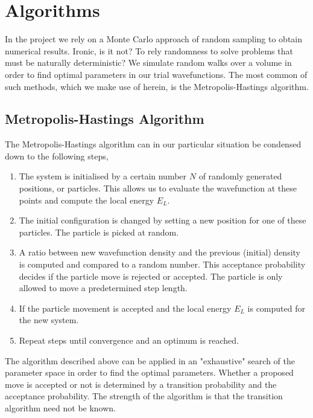\documentclass[
    a4paper, aps, twocolumn, floatfix, superscriptaddress, nofootinbib]{revtex4-1}
\newcommand{\1}{\mathds{1}}
\begin{document}
\section{Algorithms}

In the project we rely on a Monte Carlo approach of random sampling to obtain numerical results.
Ironic, is it not? To rely randomness to solve problems that must be naturally deterministic?
We simulate random walks over a volume in order to find optimal parameters in our trial wavefunctions.
The most common of such methods, which we make use of herein, is the Metropolis-Hastings algorithm.

\subsection{Metropolis-Hastings Algorithm}
The Metropolis-Hastings algorithm can in our particular situation be condensed down to the following steps,
\begin{enumerate}
    \item The system is initialised by a certain number $N$ of randomly generated positions, or particles. This allows us to evaluate the
     wavefunction at these points and compute the local energy $E_L$.
    \item The initial configuration is changed by setting a new position for one of these particles. The particle is picked at random.
    \item A ratio between new wavefunction density and the previous (initial) density is computed and compared to a random number.
    This acceptance probability decides if the particle move is rejected or accepted.
    The particle is only allowed to move a predetermined step length.
    \item If the particle movement is accepted and the local energy $E_L$ is computed for the new system.
    \item Repeat steps until convergence and an optimum is reached.
\end{enumerate}

The algorithm described above can be applied in an "exhaustive" search of the parameter space in order to find the optimal parameters.
Whether a proposed move is accepted or not is determined by a transition probability and the acceptance probability.
The strength of the algorithm is that the transition algorithm need not be known.
\end{document}
